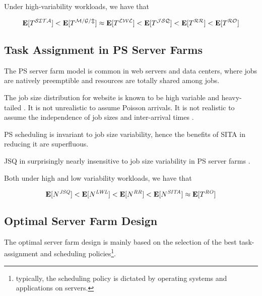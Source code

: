 Under high-variability workloads, we have that

\begin{equation}
\mathbf{E}[T^{\mathcal{SITA}}] < 
\mathbf{E}[T^{\mathcal{M/G/m}}] \approx 
\mathbf{E}[T^{\mathcal{LWL}}] < 
\mathbf{E}[T^{\mathcal{JSQ}}] < 
\mathbf{E}[T^{\mathcal{RR}}] < 
\mathbf{E}[T^{\mathcal{RO}}]
\end{equation}


\subsection{Task Assignment in PS Server Farms}
\label{sec:task-assignment-ps-server-farms}
The PS server farm model is common in web servers and data centers, where jobs are natively preemptible and resources are totally shared among jobs.

The job size distribution for website is known to be high variable and heavy-tailed \cite{crovella1997self}. It is not unrealistic to assume Poisson arrivals. It is not realistic to assume the independence of job sizes and inter-arrival times \cite{ghosh2004analysis,squillante1999internet}.

PS scheduling is invariant to job size variability, hence the benefits of SITA in reducing it are superfluous.

JSQ in surprisingly nearly insensitive to job size variability in PS server farms \cite{gupta2007analysis}.

Both under high and low variability workloads, we have that

\begin{equation}
\mathbf{E}[N^{\mathit{JSQ}}] < 
\mathbf{E}[N^{\mathit{LWL}}] < 
\mathbf{E}[N^{\mathit{RR}}] < 
\mathbf{E}[N^{\mathit{SITA}}] \approx 
\mathbf{E}[T^{\mathit{RO}}]
\end{equation}





\subsection{Optimal Server Farm Design}
\label{sec:optimal-server-farm-design}

The optimal server farm design is mainly based on the selection of the best task-assignment and scheduling policies\footnote{typically, the scheduling policy is dictated by operating systems and applications on servers.}.

